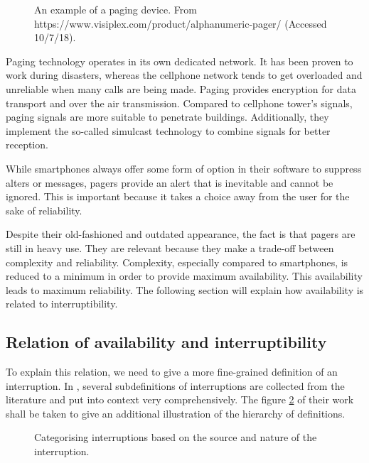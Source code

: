 \documentclass{CML_Seminar_Template}
\begin{document}
\begin{figure}[htb]
  \begin{center}
  \end{center}
    \caption{\label{pager_fig1} An example of a paging device. From https://www.visiplex.com/product/alphanumeric-pager/ (Accessed 10/7/18).}
\end{figure}

Paging technology operates in its own dedicated network. It has been proven to work during disasters, whereas the cellphone network tends to get overloaded and unreliable when many calls are being made. Paging provides encryption for data transport and over the air transmission. Compared to cellphone tower's signals, paging signals are more suitable to penetrate buildings. Additionally, they implement the so-called simulcast technology to combine signals for better reception.
\par
While smartphones always offer some form of option in their software to suppress alters or messages, pagers provide an alert that is inevitable and cannot be ignored. This is important because it takes a choice away from the user for the sake of reliability.
\par
Despite their old-fashioned and outdated appearance, the fact is that pagers are still in heavy use. They are relevant because they make a trade-off between complexity and reliability. Complexity, especially compared to smartphones, is reduced to a minimum in order to provide maximum availability. This availability leads to maximum reliability. The following section will explain how availability is related to interruptibility.

\subsection{Relation of availability and interruptibility}
To explain this relation, we need to give a more fine-grained definition of an interruption. In \cite[]{Fetter2018}, several subdefinitions of interruptions are collected from the literature and put into context very comprehensively. The figure \ref{interruptions_fig} of their work shall be taken to give an additional illustration of the hierarchy of definitions.

\begin{figure}[htb]
  \begin{center}
  \end{center}
    \caption{\label{interruptions_fig}  Categorising interruptions based on the source and nature of the interruption. \cite[]{Fetter2018}}
\end{figure}
\end{document}
